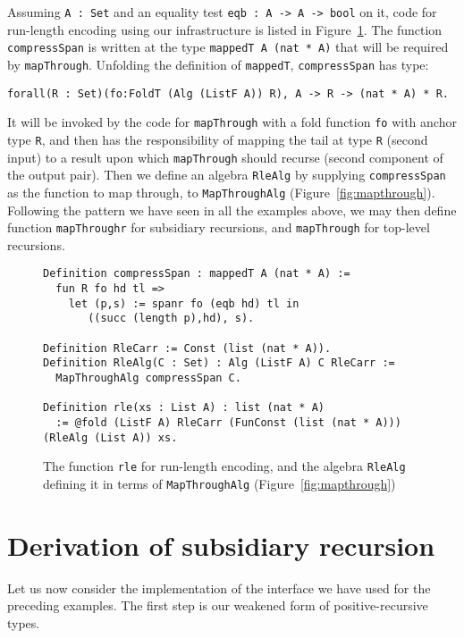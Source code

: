 \documentclass[a4paper,USenglish]{lipics-v2021}
\begin{document}
Assuming \verb|A : Set| and an equality test \verb|eqb : A -> A -> bool| on it,
code for run-length encoding using our infrastructure is listed in Figure~\ref{fig:rle}.
The function \verb|compressSpan| is written at the type \verb|mappedT A (nat * A)| that
will be required by \verb|mapThrough|.  Unfolding the definition of \verb|mappedT|,
\verb|compressSpan| has type:
\begin{verbatim}
forall(R : Set)(fo:FoldT (Alg (ListF A)) R), A -> R -> (nat * A) * R.
\end{verbatim}
\noindent It will be invoked by the code for \verb|mapThrough| with a
fold function \verb|fo| with anchor type \verb|R|, and then has the
responsibility of mapping the tail at type \verb|R| (second input) to
a result upon which \verb|mapThrough| should recurse (second component
of the output pair).  Then we define an algebra \verb|RleAlg| by
supplying \verb|compressSpan| as the function to map through, to
\verb|MapThroughAlg| (Figure~\ref{fig:mapthrough}).  Following the
pattern we have seen in all the examples above, we may then define
function \verb|mapThroughr| for subsidiary recursions, and
\verb|mapThrough| for top-level recursions.



\begin{figure}
\begin{verbatim}
Definition compressSpan : mappedT A (nat * A) :=
  fun R fo hd tl => 
    let (p,s) := spanr fo (eqb hd) tl in
       ((succ (length p),hd), s).

Definition RleCarr := Const (list (nat * A)).
Definition RleAlg(C : Set) : Alg (ListF A) C RleCarr :=
  MapThroughAlg compressSpan C.

Definition rle(xs : List A) : list (nat * A)
  := @fold (ListF A) RleCarr (FunConst (list (nat * A))) (RleAlg (List A)) xs.
\end{verbatim}
\caption{The function \texttt{rle} for run-length encoding, and the algebra \texttt{RleAlg} defining it
in terms of \texttt{MapThroughAlg} (Figure~\ref{fig:mapthrough})}
\label{fig:rle}
\end{figure}

\section{Derivation of subsidiary recursion}
\label{sec:deriv}

Let us now consider the implementation of the
interface we have used for the preceding examples.
The first step is our weakened form of positive-recursive
types.
\end{document}
